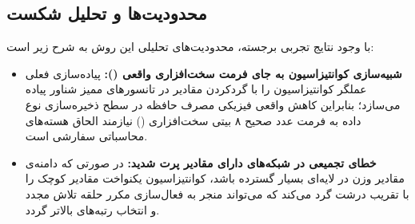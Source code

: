 \subsection{محدودیت‌ها و تحلیل شکست}
با وجود نتایج تجربی برجسته، محدودیت‌های تحلیلی این روش به شرح زیر است:
\begin{itemize}
    \item \textbf{شبیه‌سازی کوانتیزاسیون به جای فرمت سخت‌افزاری واقعی ():} پیاده‌سازی فعلی عملگر کوانتیزاسیون را با گردکردن مقادیر در تانسورهای ممیز شناور پیاده می‌سازد؛ بنابراین کاهش واقعی فیزیکی مصرف حافظه در سطح ذخیره‌سازی نوع داده به فرمت عدد صحیح ۸ بیتی سخت‌افزاری () نیازمند الحاق هسته‌های محاسباتی سفارشی است.
    \item \textbf{خطای تجمیعی در شبکه‌های دارای مقادیر پرت شدید:} در صورتی که دامنه‌ی مقادیر وزن در لایه‌ای بسیار گسترده باشد، کوانتیزاسیون یکنواخت مقادیر کوچک را با تقریب درشت گرد می‌کند که می‌تواند منجر به فعال‌سازی مکرر حلقه تلاش مجدد و انتخاب رتبه‌های بالاتر گردد.
\end{itemize}
